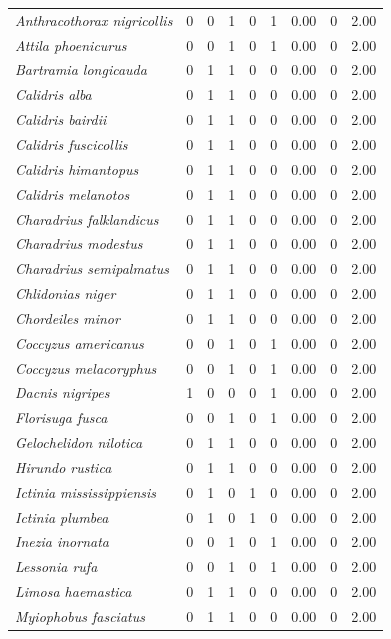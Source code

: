 \documentclass[
  oneside]{scrbook}
\begin{document}
\begin{longtable}{>{}lrrrrrrrr}
\em{Anthracothorax nigricollis} & 0 & 0 & 1 & 0 & 1 & 0.00 & 0 & 2.00\\
\em{Attila phoenicurus} & 0 & 0 & 1 & 0 & 1 & 0.00 & 0 & 2.00\\
\em{Bartramia longicauda} & 0 & 1 & 1 & 0 & 0 & 0.00 & 0 & 2.00\\
\em{Calidris alba} & 0 & 1 & 1 & 0 & 0 & 0.00 & 0 & 2.00\\
\addlinespace
\em{Calidris bairdii} & 0 & 1 & 1 & 0 & 0 & 0.00 & 0 & 2.00\\
\em{Calidris fuscicollis} & 0 & 1 & 1 & 0 & 0 & 0.00 & 0 & 2.00\\
\em{Calidris himantopus} & 0 & 1 & 1 & 0 & 0 & 0.00 & 0 & 2.00\\
\em{Calidris melanotos} & 0 & 1 & 1 & 0 & 0 & 0.00 & 0 & 2.00\\
\em{Charadrius falklandicus} & 0 & 1 & 1 & 0 & 0 & 0.00 & 0 & 2.00\\
\addlinespace
\em{Charadrius modestus} & 0 & 1 & 1 & 0 & 0 & 0.00 & 0 & 2.00\\
\em{Charadrius semipalmatus} & 0 & 1 & 1 & 0 & 0 & 0.00 & 0 & 2.00\\
\em{Chlidonias niger} & 0 & 1 & 1 & 0 & 0 & 0.00 & 0 & 2.00\\
\em{Chordeiles minor} & 0 & 1 & 1 & 0 & 0 & 0.00 & 0 & 2.00\\
\em{Coccyzus americanus} & 0 & 0 & 1 & 0 & 1 & 0.00 & 0 & 2.00\\
\addlinespace
\em{Coccyzus melacoryphus} & 0 & 0 & 1 & 0 & 1 & 0.00 & 0 & 2.00\\
\em{Dacnis nigripes} & 1 & 0 & 0 & 0 & 1 & 0.00 & 0 & 2.00\\
\em{Florisuga fusca} & 0 & 0 & 1 & 0 & 1 & 0.00 & 0 & 2.00\\
\em{Gelochelidon nilotica} & 0 & 1 & 1 & 0 & 0 & 0.00 & 0 & 2.00\\
\em{Hirundo rustica} & 0 & 1 & 1 & 0 & 0 & 0.00 & 0 & 2.00\\
\addlinespace
\em{Ictinia mississippiensis} & 0 & 1 & 0 & 1 & 0 & 0.00 & 0 & 2.00\\
\em{Ictinia plumbea} & 0 & 1 & 0 & 1 & 0 & 0.00 & 0 & 2.00\\
\em{Inezia inornata} & 0 & 0 & 1 & 0 & 1 & 0.00 & 0 & 2.00\\
\em{Lessonia rufa} & 0 & 0 & 1 & 0 & 1 & 0.00 & 0 & 2.00\\
\em{Limosa haemastica} & 0 & 1 & 1 & 0 & 0 & 0.00 & 0 & 2.00\\
\addlinespace
\em{Myiophobus fasciatus} & 0 & 1 & 1 & 0 & 0 & 0.00 & 0 & 2.00\\

\end{longtable}
\end{document}
